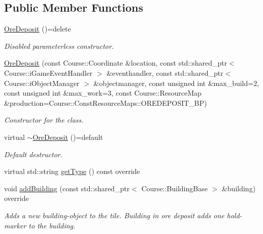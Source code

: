 \subsection*{Public Member Functions}
\begin{DoxyCompactItemize}
\item 
\hypertarget{classOreDeposit_a7e70ca70704722afb22e6805728319d5}{\hyperlink{classOreDeposit_a7e70ca70704722afb22e6805728319d5}{Ore\-Deposit} ()=delete}\label{classOreDeposit_a7e70ca70704722afb22e6805728319d5}

\begin{DoxyCompactList}\small\item\em Disabled parameterless constructor. \end{DoxyCompactList}\item 
\hyperlink{classOreDeposit_a202bfd9f46012433952ef72d0f7a8042}{Ore\-Deposit} (const Course\-::\-Coordinate \&location, const std\-::shared\-\_\-ptr$<$ Course\-::i\-Game\-Event\-Handler $>$ \&eventhandler, const std\-::shared\-\_\-ptr$<$ Course\-::i\-Object\-Manager $>$ \&objectmanager, const unsigned int \&max\-\_\-build=2, const unsigned int \&max\-\_\-work=3, const Course\-::\-Resource\-Map \&production=Course\-::\-Const\-Resource\-Maps\-::\-O\-R\-E\-D\-E\-P\-O\-S\-I\-T\-\_\-\-B\-P)
\begin{DoxyCompactList}\small\item\em Constructor for the class. \end{DoxyCompactList}\item 
\hypertarget{classOreDeposit_a05f039b0a39b07d79ec81e5abcfc06d1}{virtual \hyperlink{classOreDeposit_a05f039b0a39b07d79ec81e5abcfc06d1}{$\sim$\-Ore\-Deposit} ()=default}\label{classOreDeposit_a05f039b0a39b07d79ec81e5abcfc06d1}

\begin{DoxyCompactList}\small\item\em Default destructor. \end{DoxyCompactList}\item 
virtual std\-::string \hyperlink{classOreDeposit_a83add72db67aa3cc0a8f6632c0275bb3}{get\-Type} () const override
\item 
void \hyperlink{classOreDeposit_ab7a167ede8452a7d0427717b49fa5f12}{add\-Building} (const std\-::shared\-\_\-ptr$<$ Course\-::\-Building\-Base $>$ \&building) override
\begin{DoxyCompactList}\small\item\em Adds a new building-\/object to the tile. Building in ore deposit adds one hold-\/marker to the building. \end{DoxyCompactList}\end{DoxyCompactItemize}


